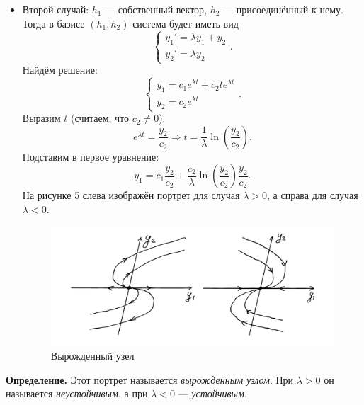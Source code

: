 \begin{itemize}
\item Второй случай: $h_1$ --- собственный вектор, $h_2$ --- присоединённый к нему.
Тогда в базисе $(h_1, h_2)$ система будет иметь вид
\[
    \begin{cases}
        y_1' = \lambda y_1 + y_2 \\
        y_2' = \lambda y_2
    \end{cases}.
\]
Найдём решение:
\[
    \begin{cases}
        y_1 = c_1 e^{\lambda t} + c_2 t e^{\lambda t} \\
        y_2 = c_2 e^{\lambda t}
    \end{cases}.
\]
Выразим $t$ (считаем, что $c_2 \ne 0$):
\[
    e^{\lambda t} = \frac{y_2}{c_2} \Rightarrow t = \frac{1}{\lambda} \ln \left( \frac{y_2}{c_2} \right).
\]
Подставим в первое уравнение:
\[
    y_1 = c_1 \frac{y_2}{c_2} + \frac{c_2}{\lambda} \ln \left( \frac{y_2}{c_2} \right) \frac{y_2}{c_2}.
\]
На рисунке 5 слева изображён портрет для случая $\lambda > 0$, а справа для случая $\lambda < 0$.
\pagebreak
\begin{figure}[h]
    \includegraphics[scale=0.25]{degenerate-knot}
    \centering
    \caption{Вырожденный узел}
\end{figure}
\end{itemize}

\textbf{Определение.} Этот портрет называется \textit{вырожденным узлом}. При $\lambda > 0$ он называется \textit{неустойчивым}, а при $\lambda < 0$ --- \textit{устойчивым}.

